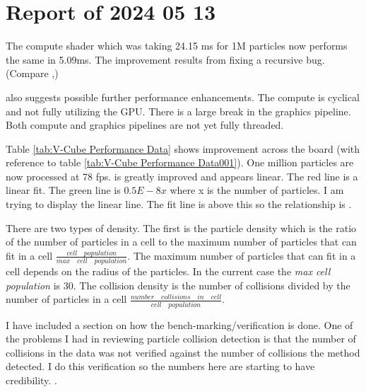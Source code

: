\section{Report of 2024 05 13}

The compute shader which was taking 24.15 ms for 1M particles now performs the same in 5.09ms. The improvement results from fixing a recursive bug.
(Compare ,)





 also suggests possible further performance enhancements. The compute is cyclical and not fully utilizing the GPU. There is a large break 
in the graphics pipeline. Both compute and graphics pipelines are not yet fully threaded.  

Table \ref{tab:V-Cube Performance Data} shows improvement across the board (with reference to table \ref{tab:V-Cube Performance Data001}). One million particles are now 
processed at 78 fps.  is greatly improved and appears linear. The red line is a linear fit. The green line is $0.5E-8x$ where x is the number of particles. 
I am trying to display the linear line. The fit line is above this so the relationship is .

There are two types of density. The first is the particle density which is the ratio of the number of particles in a cell to the maximum 
number of particles that can fit in a cell $\frac{cell\quad population}{max\quad cell\quad population}$. The maximum number of particles 
that can fit in a cell depends on the radius of the particles. In the current case the \textit{max cell population} is 30. The collision density is the number of 
collisions divided by the number of particles in a cell $\frac{number\quad collisions\quad in\quad cell}{cell\quad population}$.   

I have included a section on how the bench-marking/verification is done. One of the problems I had in reviewing particle collision detection is that 
the number of collisions in the data was not verified against the number of collisions the method detected. I do this verification so the numbers here
are starting to have credibility. .









\newpage
\clearpage
%
%
%
%

%

%

%

